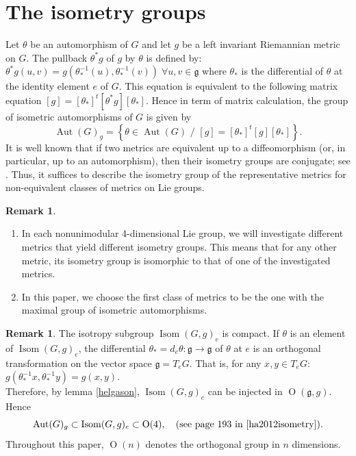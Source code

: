 \documentclass[12pt,a4paper,twoside]{article}
\theoremstyle{definition}
\newtheorem{remark}[theorem]{Remark}
\begin{document}
\section{The isometry groups}
Let $\theta$ be an automorphism of $G$ and let $g$ be a left invariant Riemannian metric on $G$. The pullback $\theta^{\ast}g$ of $g$ by $\theta$ is defined by:
$\theta^{\ast}g(u, v) = g\left(\theta_{\ast}^{-1}(u), \theta_{\ast}^{-1}(v)\right) \; \forall u, v \in \mathfrak{g}$ where $\theta_{\ast}$ is the differential of $\theta$ at the identity element $e$ of $G$. This equation is equivalent to the following matrix equation $[g] = [\theta_{\ast}]^t[\theta^{\ast}g][\theta_{\ast}]$. Hence in term of matrix calculation, the group of isometric automorphisms of $G$ is given by \cite{ha2012isometry}
$$\operatorname{Aut}(G)_{g} = \left\lbrace \theta \in \operatorname{Aut}(G)\,\, /\,\, [g] = [\theta_{\ast}]^t[g][\theta_{\ast}] \right\rbrace.$$
It is well known that if two metrics are equivalent up to a diffeomorphism (or, in particular, up to an automorphism), then their isometry groups are conjugate; see \cite{ayad2024isometry, ha2012isometry}. Thus, it suffices to describe the isometry group of the representative metrics for non-equivalent classes of metrics on Lie groups.
\begin{remark}
\begin{enumerate}
\item In each nonunimodular 4-dimensional Lie group, we will investigate different metrics that yield different isometry groups. This means that for any other metric, its isometry group is isomorphic to that of one of the investigated metrics.
\item In this paper, we choose the first class of metrics to be the one with the maximal group of isometric automorphisms.
\end{enumerate}
\end{remark}
\begin{remark} \label{orthogonal}
The isotropy subgroup $\operatorname{Isom}(G, g)_e$ is compact. If $\theta$ is an element of $\operatorname{Isom}(G, g)_e$, the differential $\theta_{\ast} = d_e\theta : \mathfrak{g} \longrightarrow \mathfrak{g}$ of $\theta$ at $e$ is an orthogonal transformation on the vector space $\mathfrak{g} = T_eG$. That is, for any $x, y \in T_eG$: $g(\theta_{\ast}^{-1}x, \theta_{\ast}^{-1}y) = g(x, y).$\\
Therefore, by lemma \ref{helgason}, $\operatorname{Isom}(G, g)_e$ can be injected in $\operatorname{O}(\mathfrak{g}, g)$. Hence
$$\operatorname{Aut}(G)_g \subset \operatorname{Isom}(G, g)_e \subset \operatorname{O}(4), \quad (\text{see page 193 in \cite{ha2012isometry}}).$$
Throughout this paper, $\operatorname{O}(n)$ denotes the orthogonal group in $n$ dimensions.
\end{remark}
\end{document}
